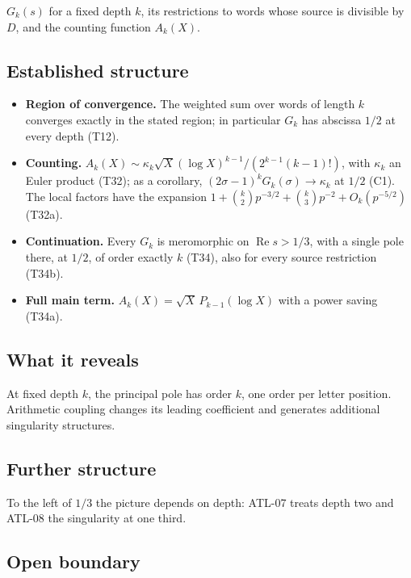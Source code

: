\documentclass[
  11pt,
]{article}
\providecommand{\tightlist}{%
  \setlength{\itemsep}{0pt}\setlength{\parskip}{0pt}}
\begin{document}
\(G_k(s)\) for a fixed depth \(k\), its restrictions to words whose
source is divisible by \(D\), and the counting function \(A_k(X)\).

\hypertarget{established-structure-5}{%
\subsection{Established structure}\label{established-structure-5}}

\begin{itemize}
\tightlist
\item
  \textbf{Region of convergence.} The weighted sum over words of length
  \(k\) converges exactly in the stated region; in particular \(G_k\)
  has abscissa \(1/2\) at every depth (T12).
\item
  \textbf{Counting.}
  \(A_k(X)\sim\kappa_k\sqrt X(\log X)^{k-1}/(2^{k-1}(k-1)!)\), with
  \(\kappa_k\) an Euler product (T32); as a corollary,
  \((2\sigma-1)^kG_k(\sigma)\to\kappa_k\) at \(1/2\) (C1). The local
  factors have the expansion
  \(1+\binom k2p^{-3/2}+\binom k3p^{-2}+O_k(p^{-5/2})\) (T32a).
\item
  \textbf{Continuation.} Every \(G_k\) is meromorphic on
  \(\operatorname{Re}s>1/3\), with a single pole there, at \(1/2\), of
  order exactly \(k\) (T34), also for every source restriction (T34b).
\item
  \textbf{Full main term.} \(A_k(X)=\sqrt X\,P_{k-1}(\log X)\) with a
  power saving (T34a).
\end{itemize}

\hypertarget{what-it-reveals-5}{%
\subsection{What it reveals}\label{what-it-reveals-5}}

At fixed depth \(k\), the principal pole has order \(k\), one order per
letter position. Arithmetic coupling changes its leading coefficient and
generates additional singularity structures.

\hypertarget{further-structure-5}{%
\subsection{Further structure}\label{further-structure-5}}

To the left of \(1/3\) the picture depends on depth: ATL-07 treats depth
two and ATL-08 the singularity at one third.

\hypertarget{open-boundary-5}{%
\subsection{Open boundary}\label{open-boundary-5}}
\end{document}
